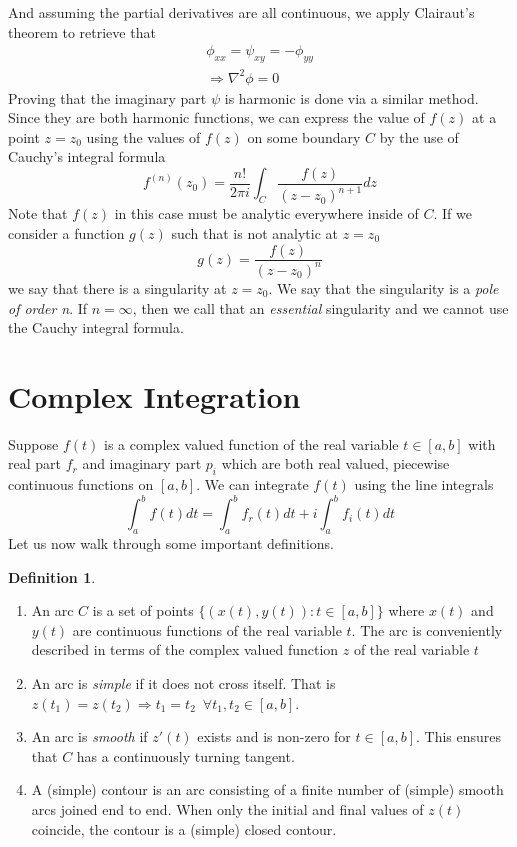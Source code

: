 \documentclass{report}
\theoremstyle{definition}
\newtheorem{definition}[theorem]{Definition}
\theoremstyle{remark}
\begin{document}
And assuming the partial derivatives are all continuous, we apply Clairaut's theorem to retrieve that 
\begin{equation*}
    \begin{split}
        \phi_{xx} = \psi_{xy} = -\phi_{yy} \\
        \Rightarrow \nabla ^2\phi =0
    \end{split}
\end{equation*}
Proving that the imaginary part $\psi$ is harmonic is done via a similar method. Since they are both harmonic functions, we can express the value of $f(z)$ at a point $z=z_0$ using the values of $f(z)$ on some boundary $C$ by the use of Cauchy's integral formula
\begin{equation*}
    f^{(n)} (z_0) = \frac{n!}{2\pi i} \int_C \frac{f(z)}{(z-z_0)^{n+1}}dz
\end{equation*}
Note that $f(z)$ in this case must be analytic everywhere inside of $C$. If we consider a function $g(z)$ such that is not analytic at $z=z_0$ 
\begin{equation*}
    g(z) = \frac{f(z)}{(z-z_0)^n}
\end{equation*}
we say that there is a singularity at $z=z_0$. We say that the singularity is a \textit{pole of order n}. If $n=\infty$, then we call that an \textit{essential} singularity and we cannot use the Cauchy integral formula. 
\section{Complex Integration}
Suppose $f(t)$ is a complex valued function of the real variable $t\in[a,b]$ with real part $f_r$ and imaginary part $p_i$ which are both real valued, piecewise continuous functions on $[a,b]$. We can integrate $f(t)$ using the line integrals 
\begin{equation}
    \int^b_af(t)dt = \int^b_af_r(t)dt +i\int^b_af_i(t)dt
\end{equation}
Let us now walk through some important definitions. 
\begin{definition}
    \leavevmode 
    \begin{enumerate}
        \item An arc $C$ is a set of points $\{ (x(t),y(t)):t\in [a,b]\}$ where $x(t)$ and $y(t)$ are continuous functions of the real variable $t$. The arc is conveniently described in terms of the complex valued function $z$ of the real variable $t$  
        \item An arc is \emph{simple} if it does not cross itself. That is $z(t_1)=z(t_2) \Rightarrow t_1=t_2 \,\,\, \forall t_1,t_2 \in[a,b]$. 
        \item An arc is \emph{smooth} if $z'(t)$ exists and is non-zero for $t\in [a,b]$. This ensures that $C$ has a continuously turning tangent.
        \item A (simple) contour is an arc consisting of a finite number of (simple) smooth arcs joined end to end. When only the initial and final values of $z(t)$ coincide, the contour is a (simple) closed contour.
    \end{enumerate}
\end{definition}
\end{document}
